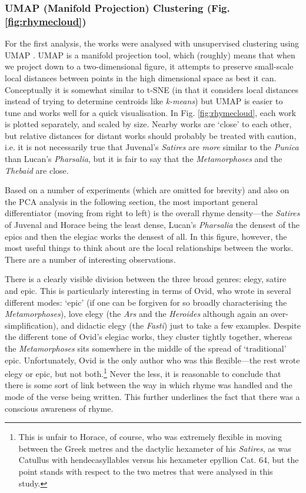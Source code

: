 \documentclass[twocolumn, switch]{article} %
\begin{document}
\subsubsection{UMAP (Manifold Projection) Clustering (Fig. \ref{fig:rhymecloud})} 

For the first analysis, the works were analysed with unsupervised clustering
using UMAP \cite{mcinnes_umap_2018}. UMAP is a manifold projection tool, which
(roughly) means that when we project down to a two-dimensional figure, it
attempts to preserve small-scale local distances between points in the high
dimensional space as best it can. Conceptually it is somewhat similar to t-SNE
(in that it considers local distances instead of trying to determine centroids
like \emph{k-means}) but UMAP is easier to tune and works well for a quick
visualisation. In Fig. \ref{fig:rhymecloud}, each work is plotted separately,
and scaled by size. Nearby works are `close' to each other, but relative
distances for distant works should probably be treated with caution, i.e. it
is not necessarily true that Juvenal's \emph{Satires} are \emph{more} similar
to the \emph{Punica} than Lucan's \emph{Pharsalia}, but it is fair to say that
the \emph{Metamorphoses} and the \emph{Thebaid} are close.

Based on a number of experiments (which are omitted for brevity) and also on
the PCA analysis in the following section, the most important general
differentiator (moving from right to left) is the overall rhyme density---the
\emph{Satires} of Juvenal and Horace being the least dense, Lucan's
\emph{Pharsalia} the densest of the epics and then the elegiac works the
densest of all. In this figure, however, the most useful things to think about
are the local relationships between the works. There are a number of
interesting observations.

There is a clearly visible division between the three broad genres: elegy,
satire and epic. This is particularly interesting in terms of Ovid, who wrote
in several different modes: `epic' (if one can be forgiven for so broadly
characterising the \emph{Metamorphoses}), love elegy (the \emph{Ars} and the
\emph{Heroides} although again an over-simplification), and didactic
elegy (the \emph{Fasti}) just to take a few examples. Despite the different
tone of Ovid's elegiac works, they cluster tightly together, whereas the
\emph{Metamorphoses} sits somewhere in the middle of the spread of
`traditional' epic. Unfortunately, Ovid is the only author who was this
flexible---the rest wrote elegy or epic, but not both.\footnote{
  This is unfair to Horace, of course, who was extremely flexible in moving
  between the Greek metres and the dactylic hexameter of his \emph{Satires}, as
  was Catullus with hendecasyllables versus his hexameter epyllion Cat. 64, but
  the point stands with respect to the two metres that were analysed in this
  study.
}
Never the less, it is reasonable to conclude that there is some sort of link
between the way in which rhyme was handled and the mode of the verse being
written. This further underlines the fact that there was a conscious awareness
of rhyme.
\end{document}
